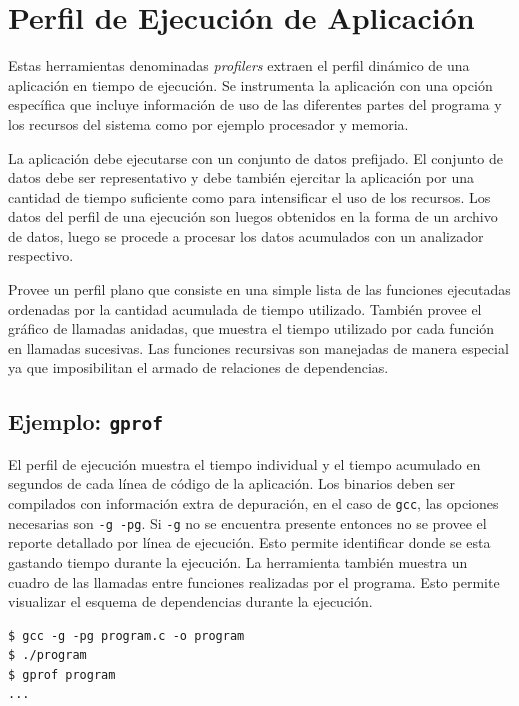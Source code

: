 \documentclass[a4paper]{report}
\begin{document}
\section{Perfil de Ejecuci\'on de Aplicaci\'on}

Estas herramientas denominadas {\it profilers} extraen el perfil din\'amico de una aplicaci\'on en tiempo de ejecuci\'on. 
Se instrumenta la aplicaci\'on con una opci\'on espec\'ifica que incluye informaci\'on de uso de las diferentes partes del programa y los recursos del sistema como por ejemplo procesador y memoria.

\bigskip

La aplicaci\'on debe ejecutarse con un conjunto de datos prefijado. El conjunto de
datos debe ser representativo y debe tambi\'en ejercitar la aplicaci\'on por
una cantidad de tiempo suficiente como para intensificar el uso de los
recursos. Los datos del perfil de una ejecuci\'on son luegos obtenidos en la
forma de un archivo de datos, luego se procede a procesar los datos acumulados
con un analizador respectivo.

\bigskip

Provee un perfil plano que consiste en una simple lista de las funciones
ejecutadas ordenadas por la cantidad acumulada de tiempo utilizado.
Tambi\'en provee el gr\'afico de llamadas anidadas, que muestra el tiempo
utilizado por cada funci\'on en llamadas sucesivas. Las funciones recursivas
son manejadas de manera especial ya que imposibilitan el armado de relaciones
de dependencias.

\subsection{Ejemplo: {\tt gprof}}

El perfil de ejecuci\'on muestra el tiempo individual y el tiempo acumulado en segundos de cada l\'inea de c\'odigo de la aplicaci\'on. Los binarios deben ser compilados con informaci\'on extra de depuraci\'on, en el caso de {\tt gcc}, las opciones necesarias son {\tt -g -pg}. Si {\tt -g} no se encuentra presente entonces no se provee el reporte detallado por l\'inea de ejecuci\'on. Esto permite identificar donde se esta gastando tiempo durante la ejecuci\'on.
La herramienta tambi\'en muestra un cuadro de las llamadas entre funciones realizadas por el programa.
Esto permite visualizar el esquema de dependencias durante la ejecuci\'on.

\begin{lstlisting} 
$ gcc -g -pg program.c -o program
$ ./program
$ gprof program
...
\end{lstlisting}
\end{document}
